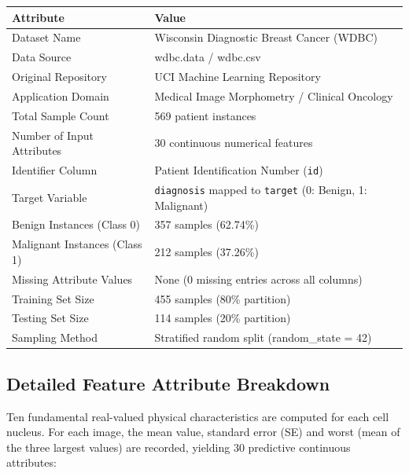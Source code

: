 \documentclass[12pt,a4paper]{article}
\begin{document}
\begin{longtable}{|p{6cm}|p{8cm}|}
\hline
\textbf{Attribute} & \textbf{Value} \\ \hline
Dataset Name & Wisconsin Diagnostic Breast Cancer (WDBC) \\ \hline
Data Source & wdbc.data / wdbc.csv \\ \hline
Original Repository & UCI Machine Learning Repository \\ \hline
Application Domain & Medical Image Morphometry / Clinical Oncology \\ \hline
Total Sample Count & 569 patient instances \\ \hline
Number of Input Attributes & 30 continuous numerical features \\ \hline
Identifier Column & Patient Identification Number (\texttt{id}) \\ \hline
Target Variable & \texttt{diagnosis} mapped to \texttt{target} (0: Benign, 1: Malignant) \\ \hline
Benign Instances (Class 0) & 357 samples (62.74\%) \\ \hline
Malignant Instances (Class 1) & 212 samples (37.26\%) \\ \hline
Missing Attribute Values & None (0 missing entries across all columns) \\ \hline
Training Set Size & 455 samples (80\% partition) \\ \hline
Testing Set Size & 114 samples (20\% partition) \\ \hline
Sampling Method & Stratified random split (random\_state = 42) \\ \hline
\end{longtable}

\subsection*{Detailed Feature Attribute Breakdown}

Ten fundamental real-valued physical characteristics are computed for each cell nucleus. For each image, the mean value, standard error (SE) and worst (mean of the three largest values) are recorded, yielding 30 predictive continuous attributes:
\end{document}
